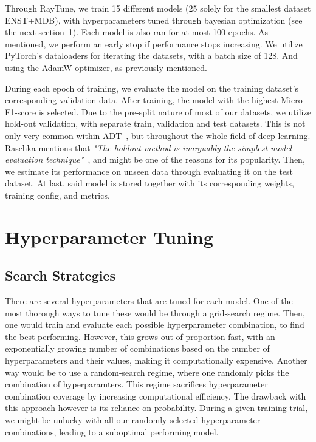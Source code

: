 Through RayTune, we train 15 different models (25 solely for the smallest dataset ENST+MDB), with hyperparameters tuned through bayesian optimization (see the next section~\ref{HyperparameterTuning}). Each model is also ran for at most 100 epochs. As mentioned, we perform an early stop if performance stops increasing. We utilize PyTorch's dataloaders for iterating the datasets, with a batch size of 128. And using the AdamW optimizer, as previously mentioned.

During each epoch of training, we evaluate the model on the training dataset's corresponding validation data. After training, the model with the highest Micro F1-score is selected. Due to the pre-split nature of most of our datasets, we utilize hold-out validation, with separate train, validation and test datasets. This is not only very common within \gls{ADT}~\cite{vogl2016recurrent, 8350302, chang2024yourmt3+}, but throughout the whole field of deep learning. Raschka mentions that \textit{"The holdout method is inarguably the simplest model evaluation technique"}~\cite{raschka2020modelevaluationmodelselection}, and might be one of the reasons for its popularity.
Then, we estimate its performance on unseen data through evaluating it on the test dataset. At last, said model is stored together with its corresponding weights, training config, and metrics.

\section{Hyperparameter Tuning}\label{HyperparameterTuning}

\subsection{Search Strategies}

There are several hyperparameters that are tuned for each model. One of the most thorough ways to tune these would be through a grid-search regime. Then, one would train and evaluate each possible hyperparameter combination, to find the best performing. However, this grows out of proportion fast, with an exponentially growing number of combinations based on the number of hyperparameters and their values, making it computationally expensive. Another way would be to use a random-search regime, where one randomly picks the combination of hyperparamters. This regime sacrifices hyperparameter combination coverage by increasing computational efficiency. The drawback with this approach however is its reliance on probability. During a given training trial, we might be unlucky with all our randomly selected hyperparameter combinations, leading to a suboptimal performing model.

